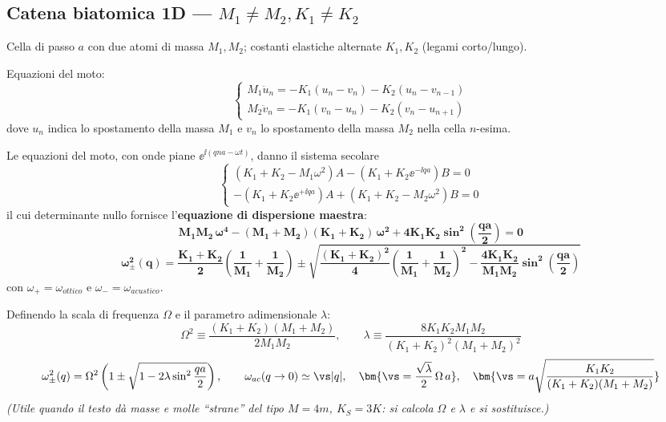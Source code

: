 \subsection{Catena biatomica 1D --- $M_1 \neq M_2, K_1 \neq K_2$}
Cella di passo $a$ con due atomi di massa $M_1, M_2$; costanti elastiche alternate $K_1, K_2$ (legami corto/lungo).

Equazioni del moto: 
\begin{equation*}
    \begin{cases}
M_1 \ddot{u}_n = -K_1(u_n - v_n) - K_2(u_n - v_{n-1}) \\
M_2 \ddot{v}_n = -K_1(v_n - u_n) - K_2(v_n - u_{n+1})
\end{cases} 
\end{equation*}
dove $u_n$ indica lo spostamento della massa $M_1$ e $v_n$ lo spostamento della massa $M_2$ nella cella $n$-esima. 

Le equazioni del moto, con onde piane $\ee^{\ii(qna-\omega t)}$, danno il sistema secolare
\[ \begin{cases} (K_1+K_2 - M_1\omega^2)A - (K_1 + K_2\ee^{-\ii qa})B = 0\\[2pt]
                 -(K_1 + K_2\ee^{+\ii qa})A + (K_1+K_2 - M_2\omega^2)B = 0 \end{cases} \]
il cui determinante nullo fornisce l'\textbf{equazione di dispersione maestra}:
\[ \bm{M_1 M_2\,\omega^4 - (M_1+M_2)(K_1+K_2)\,\omega^2 + 4K_1K_2\sin^2\!\left(\frac{qa}{2}\right) = 0} \]
\[ \bm{\omega^2_{\pm}(q) = \frac{K_1+K_2}{2}\left(\frac{1}{M_1}+\frac{1}{M_2}\right)
   \pm \sqrt{\frac{(K_1+K_2)^2}{4}\left(\frac{1}{M_1}+\frac{1}{M_2}\right)^{\!2} - \frac{4K_1K_2}{M_1M_2}\sin^2\!\left(\frac{qa}{2}\right)}} \]
con $\omega_+ = \omega_{ottico}$ e $\omega_- = \omega_{acustico}$.


Definendo la scala di frequenza $\Omega$ e il parametro adimensionale $\lambda$:
\[ \Omega^2 \equiv \frac{(K_1+K_2)(M_1+M_2)}{2M_1M_2}, \qquad
   \lambda \equiv \frac{8K_1K_2 M_1M_2}{(K_1+K_2)^2(M_1+M_2)^2} \]
\[ \omega^2_\pm(q) = \Omega^2\left(1\pm\sqrt{1-2\lambda\sin^2\frac{qa}{2}}\right),
   \qquad \omega_{ac}(q\to0)\simeq \vs|q|, \quad \bm{\vs = \frac{\sqrt{\lambda}}{2}\,\Omega\,a},  \quad   \bm{\vs = a \sqrt{\frac{K_1 K_2}{(K_1+K_2)(M_1+M_2)}}}  \]
\textit{(Utile quando il testo dà masse e molle ``strane'' del tipo $M=4m$, $K_S=3K$: si calcola $\Omega$ e $\lambda$ e si sostituisce.)}

